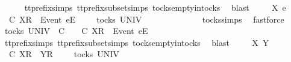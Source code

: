 \ \ \ \ \isamarkupfalse%
\ tt{\isacharunderscore}prefix{\isachardot}simps{\isacharparenleft}{}{\isacharparenright}\ tt{\isacharunderscore}prefix{\isacharunderscore}subset{\isachardot}simps{\isacharparenleft}{}{\isacharparenright}\ tocks{\isachardot}empty{\isacharunderscore}in{\isacharunderscore}tocks\ \isamarkupfalse%
\ blast\isanewline
{}\isamarkupfalse%
\isanewline
\ \ \isamarkupfalse%
\ {\isasymrho}\ X\ e\ {\isasymsigma}\isanewline
\ \ \isamarkupfalse%
\ {\isachardoublequoteopen}{\isasymrho}\ {\isasymlesssim}\isactrlsub C\ {\isacharbrackleft}X{\isacharbrackright}\isactrlsub R\ {\isacharhash}\ {\isacharbrackleft}Event\ e{\isacharbrackright}\isactrlsub E\ {\isacharhash}\ {\isasymsigma}{\isachardoublequoteclose}\ {\isachardoublequoteopen}{\isasymrho}\ {\isasymin}\ tocks\ UNIV{\isachardoublequoteclose}\isanewline
\ \ \isamarkupfalse%
\ \isamarkupfalse%
\ {\isachardoublequoteopen}{\isasymrho}\ {\isacharequal}\ {\isacharbrackleft}{\isacharbrackright}{\isachardoublequoteclose}\isanewline
\ \ \ \ \isamarkupfalse%
\ tocks{\isachardot}simps\ \isamarkupfalse%
\ fastforce\isanewline
\ \ \isamarkupfalse%
\ \isamarkupfalse%
\ {\isachardoublequoteopen}{\isasymexists}{\isasymrho}{\isacharprime}{\isasymin}tocks\ UNIV{\isachardot}\ {\isasymrho}\ {\isasymlesssim}\isactrlsub C\ {\isasymrho}{\isacharprime}\ {\isasymand}\ {\isasymrho}{\isacharprime}\ {\isasymle}\isactrlsub C\ {\isacharbrackleft}X{\isacharbrackright}\isactrlsub R\ {\isacharhash}\ {\isacharbrackleft}Event\ e{\isacharbrackright}\isactrlsub E\ {\isacharhash}\ {\isasymsigma}{\isachardoublequoteclose}\isanewline
\ \ \ \ \isamarkupfalse%
\ tt{\isacharunderscore}prefix{\isachardot}simps{\isacharparenleft}{}{\isacharparenright}\ tt{\isacharunderscore}prefix{\isacharunderscore}subset{\isachardot}simps{\isacharparenleft}{}{\isacharparenright}\ tocks{\isachardot}empty{\isacharunderscore}in{\isacharunderscore}tocks\ \isamarkupfalse%
\ blast\isanewline
{}\isamarkupfalse%
\isanewline
\ \ \isamarkupfalse%
\ {\isasymrho}\ X\ Y\ {\isasymsigma}\isanewline
\ \ \isamarkupfalse%
\ {\isachardoublequoteopen}{\isasymrho}\ {\isasymlesssim}\isactrlsub C\ {\isacharbrackleft}X{\isacharbrackright}\isactrlsub R\ {\isacharhash}\ {\isacharbrackleft}Y{\isacharbrackright}\isactrlsub R\ {\isacharhash}\ {\isasymsigma}{\isachardoublequoteclose}\ {\isachardoublequoteopen}{\isasymrho}\ {\isasymin}\ tocks\ UNIV{\isachardoublequoteclose}\isanewline
